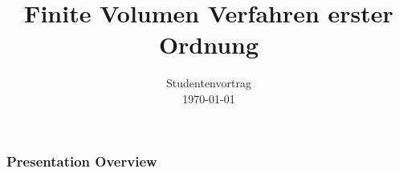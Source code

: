 \documentclass[
	11pt, %
	aspectratio=169, %
]{beamer}
\title[FV 1. O.]{Finite Volumen Verfahren erster Ordnung} %
\author[Jannik Schrempp\and Hendrik Klemm]{}%
\institute[]{University of Stuttgart} %
\date[\today]{Studentenvortrag \\ \today} %
\begin{document}
\newcommand\barbelow[1]{\stackunder[1.2pt]{$#1$}{\rule{.8ex}{.075ex}}}

\begin{frame}
		
	\titlepage %

\end{frame}



\begin{frame}
	\frametitle{Presentation Overview} %
	
	\tableofcontents %
\end{frame}

\end{document}
